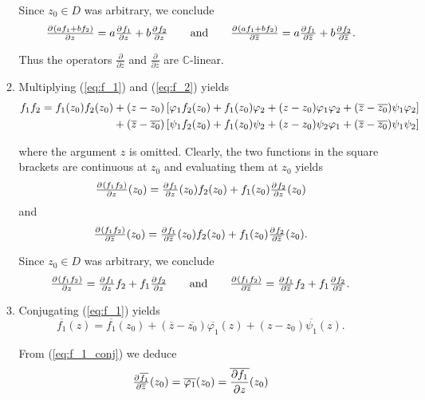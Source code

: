 \begin{enumerate}[label = \textbf{Exercise \arabic*.},wide = 0pt, itemsep=1.5ex]
\begin{enumerate}[label = (\roman*),wide = 0pt, itemsep=1.5ex]
				Since $z_0 \in D$ was arbitrary, we conclude
				\begin{equation}
					\pd{(af_1 + bf_2)}{z} = a\pd{f_1}{z} + b\pd{f_2}{z} \qquad \text{and} \qquad \pd{(af_1 + bf_2)}{\overline{z}} = a\pd{f_1}{\overline{z}} + b\pd{f_2}{\overline{z}}.
				\end{equation}

				Thus the operators $\frac{\partial}{\partial z}$ and $\frac{\partial}{\partial \overline{z}}$ are $\mathbb{C}$-linear.

			\item Multiplying (\ref{eq:f_1}) and (\ref{eq:f_2}) yields
				\begin{align*}
					f_1f_2 = f_1(z_0)f_2(z_0) &+ (z - z_0) \sbr[0]{\varphi_1f_2(z_0) + f_1(z_0)\varphi_2 + (z - z_0)\varphi_1\varphi_2 + (\overline{z} - \overline{z_0})\psi_1\varphi_2}\\
					&+ (\overline{z} - \overline{z_0})\sbr[0]{\psi_1f_2(z_0) + f_1(z_0)\psi_2 + (z - z_0)\psi_2\varphi_1 + (\overline{z} - \overline{z_0})\psi_1\psi_2}
				\end{align*}

				\noindent where the argument $z$ is omitted. Clearly, the two functions in the square brackets are continuous at $z_0$ and evaluating them at $z_0$ yields
				\begin{equation}
					\pd{(f_1f_2)}{z}(z_0) = \pd{f_1}{z}(z_0)f_2(z_0) + f_1(z_0)\pd{f_2}{z}(z_0)
				\end{equation}
				\noindent and
				\begin{equation}
					\pd{(f_1f_2)}{\overline{z}}(z_0) = \pd{f_1}{\overline{z}}(z_0)f_2(z_0) + f_1(z_0)\pd{f_2}{\overline{z}}(z_0).
				\end{equation}

				Since $z_0 \in D$ was arbitrary, we conclude
				\begin{equation}
					\pd{(f_1f_2)}{z} = \pd{f_1}{z}f_2 + f_1\pd{f_2}{z} \qquad \text{and} \qquad \pd{(f_1f_2)}{\overline{z}} = \pd{f_1}{\overline{z}}f_2 + f_1\pd{f_2}{\overline{z}}.
				\end{equation}
			\item Conjugating (\ref{eq:f_1}) yields
				\begin{equation}
					\overline{f_1}(z) = \overline{f_1}(z_0) + (\overline{z} - \overline{z_0})\overline{\varphi_1}(z) + (z - z_0)\overline{\psi_1}(z).
					\label{eq:f_1_conj}
				\end{equation}

				From (\ref{eq:f_1_conj}) we deduce 
				\begin{equation}
					\pd{\overline{f_1}}{\overline{z}}(z_0) = \overline{\varphi_1}(z_0) = \overline{\frac{\partial f_1}{\partial z}}(z_0)
					\label{eq:conj}
				\end{equation}


\end{enumerate}
\end{enumerate}
